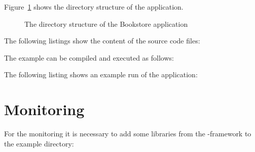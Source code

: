 \noindent Figure~\ref{Figure:PlainBookstoreExample} shows the directory structure of the application.

\begin{figure}[H]
\begin{graybox}
\end{graybox}

\caption{The directory structure of the Bookstore application}
\label{Figure:PlainBookstoreExample}
\end{figure}

\noindent The following listings show the content of the source code files:

\setJavaCodeListing





\noindent The example can be compiled and executed as follows:
\setBashListing
% 
%

\noindent The following listing shows an example run of the application:


\section{Monitoring}\label{sec:example:monitoring}
For the monitoring it is necessary to add some libraries from the \Kieker{}-framework to the example directory:
\begin{figure}[H]
\begin{graybox}
\end{graybox}
\end{figure}

